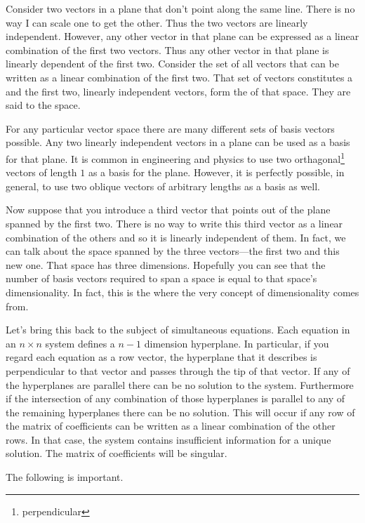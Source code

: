 Consider two vectors in a plane that don't point along the same line. There is no way I can
scale one to get the other. Thus the two vectors are linearly independent. However, any other
vector in that plane can be expressed as a linear combination of the first two vectors. Thus any
other vector in that plane is linearly dependent of the first two. Consider the set of all
vectors that can be written as a linear combination of the first two. That set of vectors
constitutes a  and the first two, linearly independent vectors, form the
 of that space. They are said to  the space.

For any particular vector space there are many different sets of basis vectors possible. Any two
linearly independent vectors in a plane can be used as a basis for that plane. It is common in
engineering and physics to use two orthagonal\footnote{perpendicular} vectors of length $1$ as a
basis for the plane. However, it is perfectly possible, in general, to use two oblique vectors
of arbitrary lengths as a basis as well.

Now suppose that you introduce a third vector that points out of the plane spanned by the first
two. There is no way to write this third vector as a linear combination of the others and so it
is linearly independent of them. In fact, we can talk about the space spanned by the three
vectors---the first two and this new one. That space has three dimensions. Hopefully you can see
that the number of basis vectors required to span a space is equal to that space's
dimensionality. In fact, this is the where the very concept of dimensionality comes from.

Let's bring this back to the subject of simultaneous equations. Each equation in an $n \times n$
system defines a $n-1$ dimension hyperplane. In particular, if you regard each equation as a row
vector, the hyperplane that it describes is perpendicular to that vector and passes through the
tip of that vector. If any of the hyperplanes are parallel there can be no solution to the
system. Furthermore if the intersection of any combination of those hyperplanes is parallel to
any of the remaining hyperplanes there can be no solution. This will occur if any row of the
matrix of coefficients can be written as a linear combination of the other rows. In that case,
the system contains insufficient information for a unique solution. The matrix of coefficients
will be singular.

The following is important.

